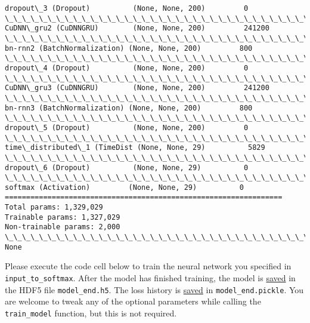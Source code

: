 \documentclass[11pt]{article}
\begin{document}
\begin{Verbatim}[commandchars=\\\{\}]
dropout\_3 (Dropout)          (None, None, 200)         0         
\_\_\_\_\_\_\_\_\_\_\_\_\_\_\_\_\_\_\_\_\_\_\_\_\_\_\_\_\_\_\_\_\_\_\_\_\_\_\_\_\_\_\_\_\_\_\_\_\_\_\_\_\_\_\_\_\_\_\_\_\_\_\_\_\_
CuDNN\_gru2 (CuDNNGRU)        (None, None, 200)         241200    
\_\_\_\_\_\_\_\_\_\_\_\_\_\_\_\_\_\_\_\_\_\_\_\_\_\_\_\_\_\_\_\_\_\_\_\_\_\_\_\_\_\_\_\_\_\_\_\_\_\_\_\_\_\_\_\_\_\_\_\_\_\_\_\_\_
bn-rnn2 (BatchNormalization) (None, None, 200)         800       
\_\_\_\_\_\_\_\_\_\_\_\_\_\_\_\_\_\_\_\_\_\_\_\_\_\_\_\_\_\_\_\_\_\_\_\_\_\_\_\_\_\_\_\_\_\_\_\_\_\_\_\_\_\_\_\_\_\_\_\_\_\_\_\_\_
dropout\_4 (Dropout)          (None, None, 200)         0         
\_\_\_\_\_\_\_\_\_\_\_\_\_\_\_\_\_\_\_\_\_\_\_\_\_\_\_\_\_\_\_\_\_\_\_\_\_\_\_\_\_\_\_\_\_\_\_\_\_\_\_\_\_\_\_\_\_\_\_\_\_\_\_\_\_
CuDNN\_gru3 (CuDNNGRU)        (None, None, 200)         241200    
\_\_\_\_\_\_\_\_\_\_\_\_\_\_\_\_\_\_\_\_\_\_\_\_\_\_\_\_\_\_\_\_\_\_\_\_\_\_\_\_\_\_\_\_\_\_\_\_\_\_\_\_\_\_\_\_\_\_\_\_\_\_\_\_\_
bn-rnn3 (BatchNormalization) (None, None, 200)         800       
\_\_\_\_\_\_\_\_\_\_\_\_\_\_\_\_\_\_\_\_\_\_\_\_\_\_\_\_\_\_\_\_\_\_\_\_\_\_\_\_\_\_\_\_\_\_\_\_\_\_\_\_\_\_\_\_\_\_\_\_\_\_\_\_\_
dropout\_5 (Dropout)          (None, None, 200)         0         
\_\_\_\_\_\_\_\_\_\_\_\_\_\_\_\_\_\_\_\_\_\_\_\_\_\_\_\_\_\_\_\_\_\_\_\_\_\_\_\_\_\_\_\_\_\_\_\_\_\_\_\_\_\_\_\_\_\_\_\_\_\_\_\_\_
time\_distributed\_1 (TimeDist (None, None, 29)          5829      
\_\_\_\_\_\_\_\_\_\_\_\_\_\_\_\_\_\_\_\_\_\_\_\_\_\_\_\_\_\_\_\_\_\_\_\_\_\_\_\_\_\_\_\_\_\_\_\_\_\_\_\_\_\_\_\_\_\_\_\_\_\_\_\_\_
dropout\_6 (Dropout)          (None, None, 29)          0         
\_\_\_\_\_\_\_\_\_\_\_\_\_\_\_\_\_\_\_\_\_\_\_\_\_\_\_\_\_\_\_\_\_\_\_\_\_\_\_\_\_\_\_\_\_\_\_\_\_\_\_\_\_\_\_\_\_\_\_\_\_\_\_\_\_
softmax (Activation)         (None, None, 29)          0         
=================================================================
Total params: 1,329,029
Trainable params: 1,327,029
Non-trainable params: 2,000
\_\_\_\_\_\_\_\_\_\_\_\_\_\_\_\_\_\_\_\_\_\_\_\_\_\_\_\_\_\_\_\_\_\_\_\_\_\_\_\_\_\_\_\_\_\_\_\_\_\_\_\_\_\_\_\_\_\_\_\_\_\_\_\_\_
None

    \end{Verbatim}

    Please execute the code cell below to train the neural network you
specified in \texttt{input\_to\_softmax}. After the model has finished
training, the model is
\href{https://keras.io/getting-started/faq/\#how-can-i-save-a-keras-model}{saved}
in the HDF5 file \texttt{model\_end.h5}. The loss history is
\href{https://wiki.python.org/moin/UsingPickle}{saved} in
\texttt{model\_end.pickle}. You are welcome to tweak any of the optional
parameters while calling the \texttt{train\_model} function, but this is
not required.
\end{document}
